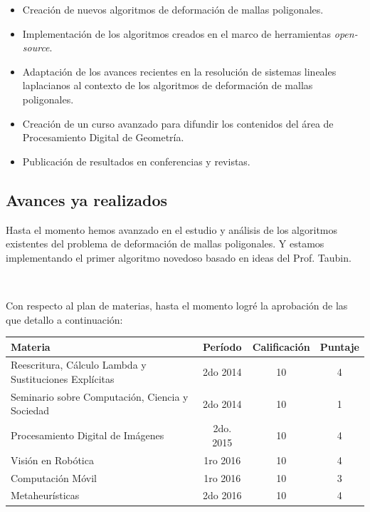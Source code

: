 \documentclass{article}
\begin{document}
\begin{itemize}

\item Creación de nuevos algoritmos de deformación de mallas poligonales.

\item Implementación de los algoritmos creados en el marco de herramientas 
\emph{open-source}.

\item Adaptación de los avances recientes en la resolución de sistemas lineales 
laplacianos al contexto de los algoritmos de deformación de mallas poligonales.

\item Creación de un curso avanzado para difundir los contenidos del área 
de Procesamiento Digital de Geometría.

\item Publicación de resultados en conferencias y revistas.

\end{itemize}

\subsection{Avances ya realizados}

Hasta el momento hemos avanzado en el estudio y análisis de los algoritmos 
existentes del problema de deformación de mallas poligonales. Y estamos 
implementando el primer algoritmo novedoso basado en ideas del Prof. Taubin. 

\

Con respecto al plan de materias, hasta el momento logré la aprobación de 
las que detallo a continuación:

\hfill

\centering
\begin{tabular}{l c c c}

\textsf{Materia} & \textsf{Período} & \textsf{Calificación} & \textsf{Puntaje}\\
\hline
Reescritura, Cálculo Lambda y Sustituciones Explícitas & 2do 2014 & 10 & 4\\
Seminario sobre Computación, Ciencia y Sociedad & 2do 2014 & 10 & 1\\
Procesamiento Digital de Imágenes & 2do. 2015 & 10  & 4 \\
Visión en Robótica & 1ro 2016 & 10 & 4 \\ 
Computación Móvil & 1ro 2016 & 10 & 3 \\ 
Metaheurísticas & 2do 2016 & 10 & 4 \\ 
\hline
\end{tabular}



\end{document}
